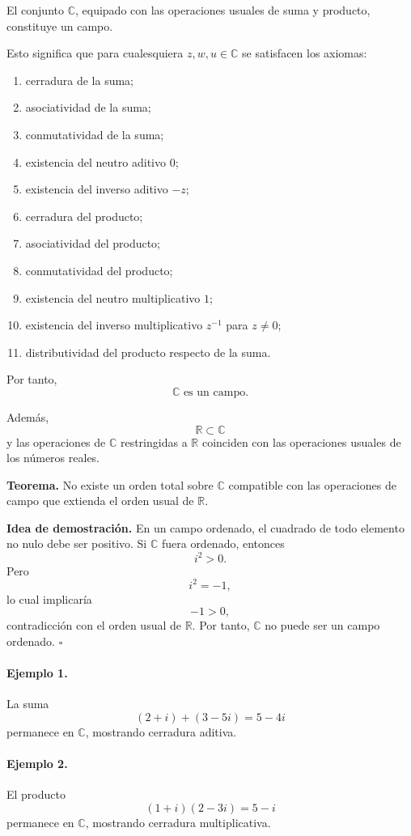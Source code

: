 El conjunto $\mathbb{C}$, equipado con las operaciones usuales de suma y
producto, constituye un campo.

Esto significa que para cualesquiera $z,w,u\in\mathbb{C}$ se satisfacen
los axiomas:

\begin{enumerate}
    \item cerradura de la suma;
    \item asociatividad de la suma;
    \item conmutatividad de la suma;
    \item existencia del neutro aditivo $0$;
    \item existencia del inverso aditivo $-z$;
    \item cerradura del producto;
    \item asociatividad del producto;
    \item conmutatividad del producto;
    \item existencia del neutro multiplicativo $1$;
    \item existencia del inverso multiplicativo $z^{-1}$ para $z\neq0$;
    \item distributividad del producto respecto de la suma.
\end{enumerate}

Por tanto,
\[
\boxed{\mathbb{C}\text{ es un campo}.}
\]

Además,
\[
\boxed{\mathbb{R}\subset\mathbb{C}}
\]
y las operaciones de $\mathbb{C}$ restringidas a $\mathbb{R}$ coinciden con
las operaciones usuales de los números reales.

\textbf{Teorema.}
No existe un orden total sobre $\mathbb{C}$ compatible con las operaciones
de campo que extienda el orden usual de $\mathbb{R}$.

\textbf{Idea de demostración.}
En un campo ordenado, el cuadrado de todo elemento no nulo debe ser positivo.
Si $\mathbb{C}$ fuera ordenado, entonces
\[
i^2>0.
\]
Pero
\[
i^2=-1,
\]
lo cual implicaría
\[
-1>0,
\]
contradicción con el orden usual de $\mathbb{R}$.
Por tanto, $\mathbb{C}$ no puede ser un campo ordenado.
\hfill$\square$

\paragraph{Ejemplo 1.}
La suma
\[
(2+i)+(3-5i)=5-4i
\]
permanece en $\mathbb{C}$, mostrando cerradura aditiva.

\paragraph{Ejemplo 2.}
El producto
\[
(1+i)(2-3i)=5-i
\]
permanece en $\mathbb{C}$, mostrando cerradura multiplicativa.

